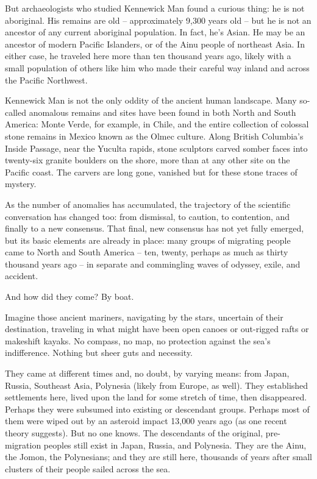 \documentclass[10pt,DIV09,letterpaper,oneside,headsepline]{scrreprt}
\begin{document}
But archaeologists who studied Kennewick Man found a curious thing: he
is not aboriginal. His remains are old -- approximately 9,300 years
old -- but he is not an ancestor of any current aboriginal population.
In fact, he's Asian. He may be an ancestor of modern Pacific
Islanders, or of the Ainu people of northeast Asia. In either case, he
traveled here more than ten thousand years ago, likely with a small
population of others like him who made their careful way inland and
across the Pacific Northwest.

Kennewick Man is not the only oddity of the ancient human landscape.
Many so-called anomalous remains and sites have been found in both
North and South America: Monte Verde, for example, in Chile, and the
entire collection of colossal stone remains in Mexico known as the
Olmec culture. Along British Columbia's Inside Passage, near the
Yuculta rapids, stone sculptors carved somber faces into twenty-six
granite boulders on the shore, more than at any other site on the
Pacific coast. The carvers are long gone, vanished but for these stone
traces of mystery.

As the number of anomalies has accumulated, the trajectory of the
scientific conversation has changed too: from dismissal, to caution,
to contention, and finally to a new consensus. That final, new
consensus has not yet fully emerged, but its basic elements are
already in place: many groups of migrating people came to North and
South America -- ten, twenty, perhaps as much as thirty thousand years
ago -- in separate and commingling waves of odyssey, exile, and
accident.

And how did they come? By boat.

Imagine those ancient mariners, navigating by the stars, uncertain of
their destination, traveling in what might have been open canoes or
out-rigged rafts or makeshift kayaks. No compass, no map, no
protection against the sea's indifference. Nothing but sheer guts and
necessity.

They came at different times and, no doubt, by varying means: from
Japan, Russia, Southeast Asia, Polynesia (likely from Europe, as
well). They established settlements here, lived upon the land for some
stretch of time, then disappeared. Perhaps they were subsumed into
existing or descendant groups. Perhaps most of them were wiped out by
an asteroid impact 13,000 years ago (as one recent theory suggests).
But no one knows. The descendants of the original, pre-migration
peoples still exist in Japan, Russia, and Polynesia. They are the
Ainu, the Jomon, the Polynesians; and they are still here, thousands
of years after small clusters of their people sailed across the sea.
\end{document}
